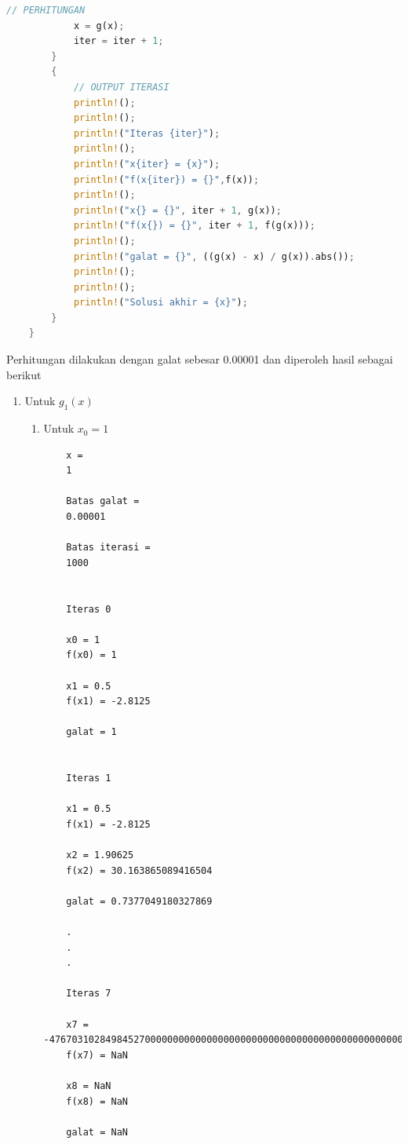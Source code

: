 \documentclass[12pt]{article}
\begin{document}
\begin{enumerate}
{\begin{lstlisting}[language=Rust, style=colouredRust]
            // PERHITUNGAN
            x = g(x);
            iter = iter + 1;
        }
        {
            // OUTPUT ITERASI
            println!();
            println!();
            println!("Iteras {iter}");
            println!();
            println!("x{iter} = {x}");
            println!("f(x{iter}) = {}",f(x));
            println!();
            println!("x{} = {}", iter + 1, g(x));
            println!("f(x{}) = {}", iter + 1, f(g(x)));
            println!();
            println!("galat = {}", ((g(x) - x) / g(x)).abs());
            println!();
            println!();
            println!("Solusi akhir = {x}");
        }
    }
        \end{lstlisting} 
        Perhitungan dilakukan dengan galat sebesar 0.00001 dan diperoleh hasil sebagai berikut
        \begin{enumerate}
            \item {
                Untuk $ g_1(x) $
                \begin{enumerate}
                    \item {
                        Untuk $ x_0 = 1 $
                        \begin{lstlisting}
    x =
    1
    
    Batas galat =
    0.00001
    
    Batas iterasi =
    1000
    
    
    Iteras 0
    
    x0 = 1
    f(x0) = 1
    
    x1 = 0.5
    f(x1) = -2.8125
    
    galat = 1
    
    
    Iteras 1
    
    x1 = 0.5
    f(x1) = -2.8125
    
    x2 = 1.90625
    f(x2) = 30.163865089416504
    
    galat = 0.7377049180327869
    
    .
    .
    .

    Iteras 7
    
    x7 = -47670310284984527000000000000000000000000000000000000000000000000000000000000000000000000000000000000000000000000000000000000000000000000000000000000000000000000000000000000000000000000000000000000000000000000000000000000000000000000000000000000000000000
    f(x7) = NaN
    
    x8 = NaN
    f(x8) = NaN
    
    galat = NaN
    

\end{lstlisting}}
\end{enumerate}}
\end{enumerate}}
\end{enumerate}
\end{document}
